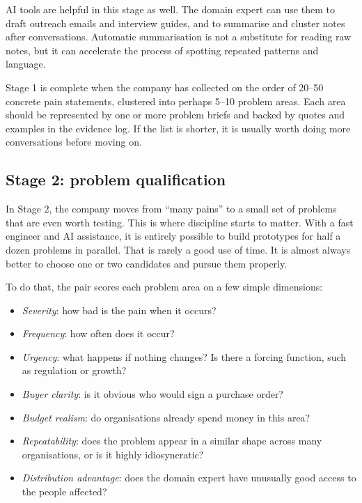 \documentclass[10pt, a4paper, twocolumn]{article} %
\begin{document}
AI tools are helpful in this stage as well. The domain expert can use them to draft outreach emails and interview guides, and to summarise and cluster notes after conversations. Automatic summarisation is not a substitute for reading raw notes, but it can accelerate the process of spotting repeated patterns and language.

Stage 1 is complete when the company has collected on the order of 20--50 concrete pain statements, clustered into perhaps 5--10 problem areas. Each area should be represented by one or more problem briefs and backed by quotes and examples in the evidence log. If the list is shorter, it is usually worth doing more conversations before moving on.

\newpage
\subsection{Stage 2: problem qualification}

In Stage 2, the company moves from ``many pains'' to a small set of problems that are even worth testing. This is where discipline starts to matter. With a fast engineer and AI assistance, it is entirely possible to build prototypes for half a dozen problems in parallel. That is rarely a good use of time. It is almost always better to choose one or two candidates and pursue them properly.

To do that, the pair scores each problem area on a few simple dimensions:

\begin{itemize}
  \item \emph{Severity}: how bad is the pain when it occurs?
  \item \emph{Frequency}: how often does it occur?
  \item \emph{Urgency}: what happens if nothing changes? Is there a forcing function, such as regulation or growth?
  \item \emph{Buyer clarity}: is it obvious who would sign a purchase order?
  \item \emph{Budget realism}: do organisations already spend money in this area?
  \item \emph{Repeatability}: does the problem appear in a similar shape across many organisations, or is it highly idiosyncratic?
  \item \emph{Distribution advantage}: does the domain expert have unusually good access to the people affected?
\end{itemize}
\end{document}
